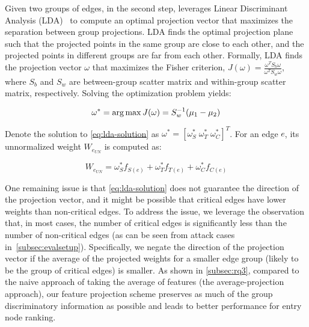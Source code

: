 Given two groups of edges, in the second step, \tool leverages Linear Discriminant Analysis (LDA)~\cite{Mika99fisherdiscriminant} to compute an optimal projection vector that maximizes the separation between group projections.
%
LDA finds the optimal projection plane such that the projected points in the same group are close to each other, and the projected points in different groups are far from each other.
%
Formally, LDA finds the projection vector $\omega$ that maximizes the Fisher criterion, $J(\omega) = \frac{\omega^TS_b\omega}{\omega^TS_w\omega}$, where $S_b$ and $S_w$ are between-group scatter matrix and within-group scatter matrix, respectively. 
%
Solving the optimization problem yields:

\begin{equation}
    \label{eq:lda-solution}
    \omega^* = \argmax J(\omega) = S_w^{-1}(\mu_1-\mu_2)
\end{equation}

Denote the solution to \cref{eq:lda-solution} as $\omega^{*} = [\omega^{*}_{S}\; \omega^{*}_{T}\; \omega^{*}_{C}]^T$.
For an edge $e$, its unnormalized weight $W_{e_{UN}}$ is computed as:

\begin{equation}
    \label{eq:projection}
    W_{e_{UN}} = \omega^{*}_{S} f_{S(e)} + \omega^{*}_{T} f_{T(e)} + \omega^{*}_{C} f_{C(e)}
\end{equation}

One remaining issue is that \cref{eq:lda-solution} does not guarantee the direction of the projection vector, and it might be possible that 
critical edges have lower weights than non-critical edges.
To address the issue, we leverage the observation that, in most cases, the number of critical edges is significantly less than the number of non-critical edges (as can be seen from attack cases in~\cref{subsec:evalsetup}).
Specifically, we negate the direction of the projection vector if the average of the projected weights for a smaller edge group (likely to be the group of critical edges) is smaller.
%
As shown in \cref{subsec:rq3}, compared to the naive approach of taking the average of features (the average-projection approach), our feature projection scheme preserves as much of the group discriminatory information as possible and leads to better performance for entry node ranking.





